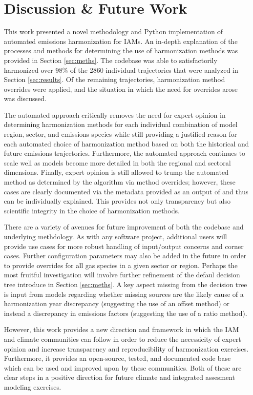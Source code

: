 \section{Discussion \& Future Work}\label{sec:future}

This work presented a novel methodology and Python implementation of automated
emissions harmonization for IAMs. An in-depth explanation of the processes and
methods for determining the use of harmonization methods was provided in Section
\ref{sec:meths}. The  codebase was able to satisfactorily
harmonized over 98\% of the 2860 individual trajectories that were analyzed in
Section \ref{sec:results}. Of the remaining trajectories, harmonization method
overrides were applied, and the situation in which the need for overrides arose
was discussed.

The automated approach critically removes the need for expert opinion in
determining harmonization methods for each individual combination of model
region, sector, and emissions species while still providing a justified reason
for each automated choice of harmonization method based on both the historical
and future emissions trajectories. Furthermore, the automated approach continues
to scale well as models become more detailed in both the regional and sectoral
dimensions. Finally, expert opinion is still allowed to trump the automated
method as determined by the algorithm via method overrides; however, these cases
are clearly documented via the metadata provided as an output of 
and thus can be individually explained. This provides not only transparency but
also scientific integrity in the choice of harmonization methods.

There are a variety of avenues for future improvement of both the 
codebase and underlying methdology. As with any software project, additional
users will provide use cases for more robust handling of input/output concerns
and corner cases. Further configuration parameters may also be added in the
future in order to provide overrides for all gas species in a given sector or
region. Perhaps the most fruitful investigation will involve further refinement
of the defaul decision tree introduce in Section \ref{sec:meths}. A key aspect
missing from the decision tree is input from models regarding whether missing
sources are the likely cause of a harmonization year discrepancy (suggesting the
use of an offset method) or instead a discrepancy in emissions factors
(suggesting the use of a ratio method). 

However, this work provides a new direction and framework in which the IAM and
climate communities can follow in order to reduce the necessicity of expert
opinion and increase transparency and reproducibility of harmonization
exercises. Furthermore, it provides an open-source, tested, and documented code
base which can be used and improved upon by these communities. Both of these are
clear steps in a positive direction for future climate and integrated assesment
modeling exercises.
